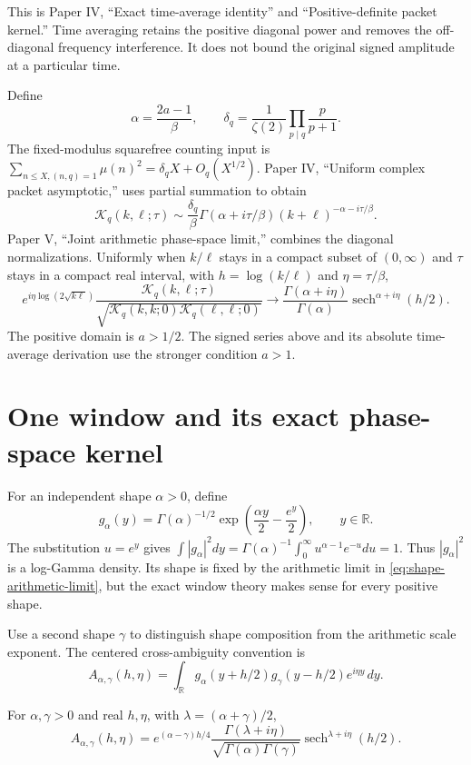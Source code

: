 This is Paper IV, ``Exact time-average identity'' and ``Positive-definite packet
kernel.'' Time averaging retains the positive diagonal power and removes the
off-diagonal frequency interference. It does not bound the original signed
amplitude at a particular time.

Define
\[
 \alpha=\frac{2a-1}{\beta},\qquad
 \delta_q=\frac1{\zeta(2)}\prod_{p\mid q}\frac{p}{p+1}.
\]
The fixed-modulus squarefree counting input is
$\sum_{n\leq X,(n,q)=1}\mu(n)^2=\delta_q X+O_q(X^{1/2})$.
Paper IV, ``Uniform complex packet asymptotic,'' uses partial summation to obtain
\[
 \mathcal K_q(k,\ell;\tau)
 \sim\frac{\delta_q}{\beta}\Gamma(\alpha+i\tau/\beta)
 (k+\ell)^{-\alpha-i\tau/\beta}.
\]
Paper V, ``Joint arithmetic phase-space limit,'' combines the diagonal
normalizations. Uniformly when $k/\ell$ stays in a compact subset of
$(0,\infty)$ and $\tau$ stays in a compact real interval, with
$h=\log(k/\ell)$ and $\eta=\tau/\beta$,
\begin{equation}
 e^{i\eta\log(2\sqrt{k\ell})}
 \frac{\mathcal K_q(k,\ell;\tau)}
 {\sqrt{\mathcal K_q(k,k;0)\mathcal K_q(\ell,\ell;0)}}
 \longrightarrow
 \frac{\Gamma(\alpha+i\eta)}{\Gamma(\alpha)}
 \operatorname{sech}^{\alpha+i\eta}(h/2).
 \label{eq:shape-arithmetic-limit}
\end{equation}
The positive domain is $a>1/2$. The signed series above and its absolute
time-average derivation use the stronger condition $a>1$.

\section{One window and its exact phase-space kernel}

For an independent shape $\alpha>0$, define
\[
 g_\alpha(y)=\Gamma(\alpha)^{-1/2}
 \exp\left(\frac{\alpha y}{2}-\frac{e^y}{2}\right),
 \qquad y\in\mathbb R.
\]
The substitution $u=e^y$ gives
$\int |g_\alpha|^2dy=\Gamma(\alpha)^{-1}
\int_0^\infty u^{\alpha-1}e^{-u}du=1$.
Thus $|g_\alpha|^2$ is a log-Gamma density. Its shape is fixed by the arithmetic
limit in \eqref{eq:shape-arithmetic-limit}, but the exact window theory makes
sense for every positive shape.

Use a second shape $\gamma$ to distinguish shape composition from the arithmetic
scale exponent. The centered cross-ambiguity convention is
\[
 A_{\alpha,\gamma}(h,\eta)
 =\int_{\mathbb R}g_\alpha(y+h/2)g_\gamma(y-h/2)e^{i\eta y}\,dy.
\]

\begin{theorem}
For $\alpha,\gamma>0$ and real $h,\eta$, with $\lambda=(\alpha+\gamma)/2$,
\begin{equation}
 A_{\alpha,\gamma}(h,\eta)
 =e^{(\alpha-\gamma)h/4}
 \frac{\Gamma(\lambda+i\eta)}{\sqrt{\Gamma(\alpha)\Gamma(\gamma)}}
 \operatorname{sech}^{\lambda+i\eta}(h/2).
 \label{eq:shape-cross-ambiguity}
\end{equation}
\end{theorem}

